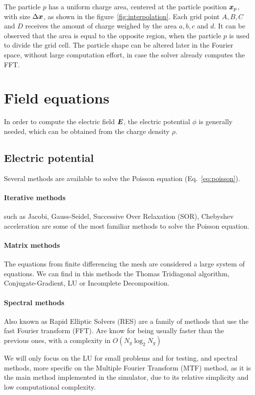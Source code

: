 %
The particle $p$ has a uniform charge area, centered at the particle position 
$\bm{x}_p$, with size $\Delta \bm{x}$, as shown in the figure~\ref{fig:interpolation}.  
Each grid point $A,B,C$ and $D$ receives the amount of charge weighed by the 
area $a,b,c$ and $d$. It can be observed that the area is equal to the opposite 
region, when the particle $p$ is used to divide the grid cell.
%
The particle shape can be altered later in the Fourier space, without large 
computation effort, in case the solver already computes the FFT.
%
\section{Field equations}

In order to compute the electric field $\bm{E}$, the electric potential $\phi$ is 
generally needed, which can be obtained from the charge density $\rho$.

\subsection{Electric potential}
Several methods are available to solve the Poisson equation 
(Eq.~\ref{eq:poisson}).

\paragraph{Iterative  methods} such as Jacobi, Gauss-Seidel, Successive Over 
Relaxation (SOR), Chebyshev acceleration are some of the most familiar methods 
to solve the Poisson equation.

\paragraph{Matrix methods} The equations from finite differencing the mesh are 
considered a large system of equations. We can find in this methods the Thomas 
Tridiagonal algorithm, Conjugate-Gradient, LU or Incomplete Decomposition.

\paragraph{Spectral methods} Also known as Rapid Elliptic Solvers (RES) are a 
family of methods that use the fast Fourier transform (FFT). Are know for being 
usually faster than the previous ones, with a complexity in $O(N_g \log_2 N_g)$

\vspace{1em}
\noindent
%
We will only focus on the LU for small problems and for testing, and spectral 
methods, more specific on the Multiple Fourier Transform (MTF) method, as it is 
the main method implemented in the simulator, due to its relative simplicity and 
low computational complexity.

